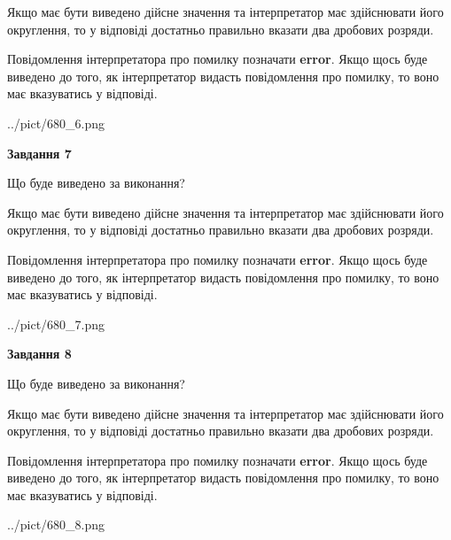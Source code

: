 \documentclass[12pt, ukrainian]{article}
\begin{document}
{\begin {Large}
Якщо має бути виведено дійсне значення та інтерпретатор має здійснювати його округлення, 
то у відповіді достатньо правильно вказати два дробових розряди.

Повідомлення інтерпретатора про помилку позначати \textbf{error}.
Якщо щось буде виведено до того, як інтерпретатор видасть повідомлення про помилку, 
то воно має вказуватись у відповіді. \par

\begin{center}
	{../pict/680_6.png}
\end{center}
\newpage

{\begin {center}\textbf{Завдання 7}\end {center}}\par
Що буде виведено за виконання? \par

Якщо має бути виведено дійсне значення та інтерпретатор має здійснювати його округлення, 
то у відповіді достатньо правильно вказати два дробових розряди.

Повідомлення інтерпретатора про помилку позначати \textbf{error}.
Якщо щось буде виведено до того, як інтерпретатор видасть повідомлення про помилку, 
то воно має вказуватись у відповіді. \par

\begin{center}
	{../pict/680_7.png}
\end{center}
\newpage

{\begin {center}\textbf{Завдання 8}\end {center}}\par
Що буде виведено за виконання? \par

Якщо має бути виведено дійсне значення та інтерпретатор має здійснювати його округлення, 
то у відповіді достатньо правильно вказати два дробових розряди.

Повідомлення інтерпретатора про помилку позначати \textbf{error}.
Якщо щось буде виведено до того, як інтерпретатор видасть повідомлення про помилку, 
то воно має вказуватись у відповіді. \par

\begin{center}
	{../pict/680_8.png}
\end{center}
\newpage


\end{Large}}
\end{document}

